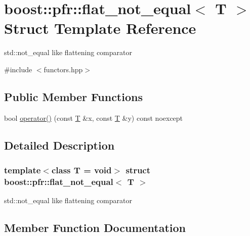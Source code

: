 \hypertarget{structboost_1_1pfr_1_1flat__not__equal}{}\section{boost\+:\+:pfr\+:\+:flat\+\_\+not\+\_\+equal$<$ T $>$ Struct Template Reference}
\label{structboost_1_1pfr_1_1flat__not__equal}


std\+::not\+\_\+equal like flattening comparator  




{\ttfamily \#include $<$functors.\+hpp$>$}

\subsection*{Public Member Functions}
\begin{DoxyCompactItemize}
\item 
bool \mbox{\hyperlink{structboost_1_1pfr_1_1flat__not__equal_a16f41e7f40d424683989dd0668344f2c}{operator()}} (const \mbox{\hyperlink{struct_t}{T}} \&x, const \mbox{\hyperlink{struct_t}{T}} \&y) const noexcept
\end{DoxyCompactItemize}


\subsection{Detailed Description}
\subsubsection*{template$<$class T = void$>$\newline
struct boost\+::pfr\+::flat\+\_\+not\+\_\+equal$<$ T $>$}

std\+::not\+\_\+equal like flattening comparator 

\subsection{Member Function Documentation}
\mbox{\label{structboost_1_1pfr_1_1flat__not__equal_a16f41e7f40d424683989dd0668344f2c}} 
